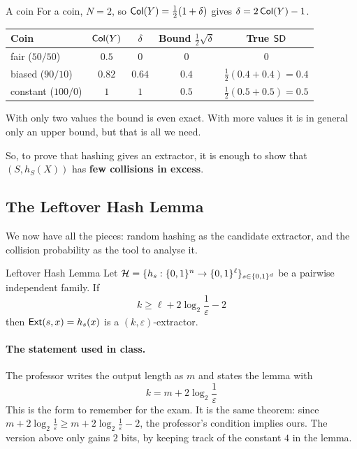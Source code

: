 \begin{framedex}{A coin}
  For a coin, $N = 2$, so $\mathsf{Col}(Y) = \frac{1}{2}(1 + \delta)$ gives $\delta = 2\,\mathsf{Col}(Y) - 1$.
  \begin{center}
    \small
    \begin{tabular}{@{}lcccc@{}}
      \toprule
      \textbf{Coin} & $\mathsf{Col}(Y)$ & $\delta$ & \textbf{Bound} $\frac{1}{2}\sqrt{\delta}$ & \textbf{True} $\mathsf{SD}$ \\
      \midrule
      fair ($50/50$) & $0.5$ & $0$ & $0$ & $0$ \\
      biased ($90/10$) & $0.82$ & $0.64$ & $0.4$ & $\frac{1}{2}(0.4 + 0.4) = 0.4$ \\
      constant ($100/0$) & $1$ & $1$ & $0.5$ & $\frac{1}{2}(0.5 + 0.5) = 0.5$ \\
      \bottomrule
    \end{tabular}
  \end{center}
  With only two values the bound is even exact. With more values it is in general only an upper bound, but that is all we need.
\end{framedex}

So, to prove that hashing gives an extractor, it is enough to show that $(S, h_S(X))$ has \textbf{few collisions in excess}.

\subsection{The Leftover Hash Lemma}

We now have all the pieces: random hashing as the candidate extractor, and the collision probability as the tool to analyse it.

\begin{framedthm}[label={thm:lhl}]{Leftover Hash Lemma}
  Let $\mathcal{H} = \{h_s : \{0,1\}^n \to \{0,1\}^\ell\}_{s \in \{0,1\}^d}$ be a pairwise independent family. If
  \[
    k \geq \ell + 2\log_2\frac{1}{\varepsilon} - 2
  \]
  then $\mathsf{Ext}(s, x) = h_s(x)$ is a $(k, \varepsilon)$-extractor.
\end{framedthm}

\paragraph{The statement used in class.} The professor writes the output length as $m$ and states the lemma with
\[
  k = m + 2\log_2\frac{1}{\varepsilon}
\]
This is the form to remember for the exam. It is the same theorem: since $m + 2\log_2\frac{1}{\varepsilon} \geq m + 2\log_2\frac{1}{\varepsilon} - 2$, the professor's condition implies ours. The version above only gains $2$ bits, by keeping track of the constant $4$ in the lemma.

